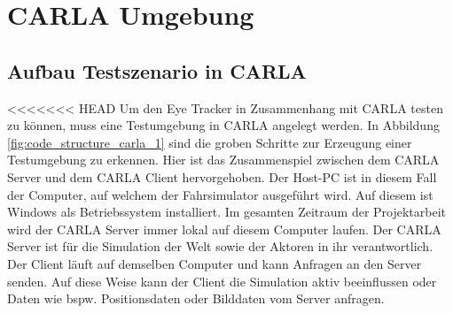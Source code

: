 \chapter{CARLA Umgebung}
\label{sec:carla umgebung}

\section{Aufbau Testszenario in CARLA}

<<<<<<< HEAD
Um den Eye Tracker in Zusammenhang mit CARLA testen zu können, muss eine Testumgebung in CARLA angelegt werden. In Abbildung \ref{fig:code_structure_carla_1} sind die groben Schritte zur Erzeugung einer Testumgebung zu erkennen. Hier ist das Zusammenspiel zwischen dem CARLA Server und dem CARLA Client hervorgehoben. Der Host-PC ist in diesem Fall der Computer, auf welchem der Fahrsimulator ausgeführt wird. Auf diesem ist Windows als Betriebssystem installiert. Im gesamten Zeitraum der Projektarbeit wird der CARLA Server immer lokal auf diesem Computer laufen. Der CARLA Server ist für die Simulation der Welt sowie der Aktoren in ihr verantwortlich. Der Client läuft auf demselben Computer und kann Anfragen an den Server senden. Auf diese Weise kann der Client die Simulation aktiv beeinflussen oder Daten wie bspw. Positionsdaten oder Bilddaten vom Server anfragen. \cite{lit_website_carla_documentation}

